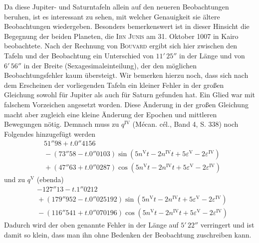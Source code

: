 Da diese Jupiter- und Saturntafeln allein auf den neueren Beobachtungen beruhen, ist es interessant zu sehen, mit welcher Genauigkeit sie ältere Beobachtungen wiedergeben. Besonders bemerkenswert ist in dieser Hinsicht die Begegnung der beiden Planeten, die \textsc{Ibn Junis} am 31. Oktober 1007 in Kairo beobachtete. Nach der Rechnung von \textsc{Bouvard} ergibt sich hier zwischen den Tafeln und der Beobachtung ein Unterschied von $11'\,25''$ in der Länge und von $6'\,56''$ in der Breite (Sexagesimaleinteilung), der den möglichen Beobachtungsfehler kaum übersteigt. Wir bemerken hierzu noch, dass sich nach dem Erscheinen der vorliegenden Tafeln ein kleiner Fehler in der großen Gleichung sowohl für Jupiter als auch für Saturn gefunden hat. Ein Glied war mit falschem Vorzeichen angesetzt worden. Diese Änderung in der großen Gleichung macht aber zugleich eine kleine Änderung der Epochen und mittleren Bewegungen nötig. Demnach muss zu $q^{\mathrm{IV}}$ (Mécan. cél., Band 4, S. 338) noch Folgendes hinzugefügt werden
\[
\begin{aligned}
&51''98 + t.0''4156\\
&{}- (73''58 - t.0''0103)\sin(5n^{\mathrm{V}}t - 2n^{\mathrm{IV}}t + 5\varepsilon^{\mathrm{V}} - 2\varepsilon^{\mathrm{IV}})\\
&{}+ (47''63 + t.0''0287)\cos(5n^{\mathrm{V}}t - 2n^{\mathrm{IV}}t + 5\varepsilon^{\mathrm{V}} - 2\varepsilon^{\mathrm{IV}})
\end{aligned}
\]
und zu $q^{\mathrm{V}}$ (ebenda)
\[
\begin{aligned}
&-127''13 - t.1''0212\\
&{}+ (179''952 - t.0''025192)\sin(5n^{\mathrm{V}}t - 2n^{\mathrm{IV}}t + 5\varepsilon^{\mathrm{V}} - 2\varepsilon^{\mathrm{IV}})\\
&{}- (116''541 + t.0''070196)\cos(5n^{\mathrm{V}}t - 2n^{\mathrm{IV}}t + 5\varepsilon^{\mathrm{V}} - 2\varepsilon^{\mathrm{IV}})
\end{aligned}
\]
Dadurch wird der oben genannte Fehler in der Länge auf $5'\,22''$ verringert und ist damit so klein, dass man ihn ohne Bedenken der Beobachtung zuschreiben kann.

